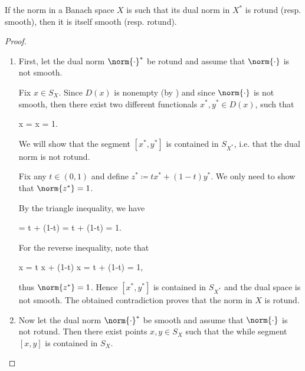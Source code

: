 \begin{theorem}\label{thm:smooth_rotund_norm_duality}
  If the norm in a Banach space \( X \) is such that its dual norm in \( X^* \) is rotund (resp. smooth), then it is itself smooth (resp. rotund).
\end{theorem}
\begin{proof}
  \begin{enumerate}
    \item First, let the dual norm \( \norm{\cdot}^* \) be rotund and assume that \( \norm{\cdot} \) is not smooth.

          Fix \( x \in S_X \). Since \( D(x) \) is nonempty (by ) and since \( \norm{\cdot} \) is not smooth, then there exist two different functionals \( x^*, y^* \in D(x) \), such that
          \begin{balign*}
             x
            =
             x
            =
            1.
          \end{balign*}

          We will show that the segment \( [x^*, y^*] \) is contained in \( S_{X^*} \), i.e. that the dual norm is not rotund.

          Fix any \( t \in (0, 1) \) and define \( z^* \coloneqq t x^* + (1-t) y^* \). We only need to show that \( \norm{z^*} = 1 \).

          By the triangle inequality, we have
          \begin{balign*}
            =
            \leq
            t  + (1-t) 
            =
            t + (1-t)
            =
            1.
          \end{balign*}

          For the reverse inequality, note that
          \begin{balign*}
            \geq
             x
            =
            t  x + (1-t)  x
            =
            t + (1-t)
            =
            1,
          \end{balign*}
          thus \( \norm{z^*} = 1 \). Hence \( [x^*, y^*] \) is contained in \( S_{X^*} \) and the dual space is not smooth. The obtained contradiction proves that the norm in \( X \) is rotund.

    \item Now let the dual norm \( \norm{\cdot}^* \) be smooth and assume that \( \norm{\cdot} \) is not rotund. Then there exist points \( x, y \in S_X \) such that the while segment \( [x, y] \) is contained in \( S_X \).


\end{enumerate}
\end{proof}
